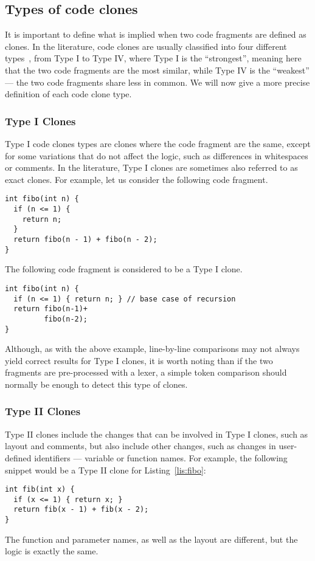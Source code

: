 \subsection{Types of code clones}
It is important to define what is implied when two code fragments are
defined as clones. In the literature, code clones are usually
classified into four different types~\cite{Roy07asurvey}, from Type I to Type IV,
where Type I is the ``strongest'', meaning here that the two code fragments are
the most similar, while Type IV is the ``weakest'' --- the two code fragments
share less in common. We will now give a more precise definition of each code
clone type.
\subsubsection{Type I Clones}
Type I code clones types are clones where the code fragment are the same,
except for some variations that do not affect the logic, such as differences
in whitespaces or comments. In the literature, Type I clones are sometimes also
referred to as exact clones.
For example, let us consider the following code fragment.
\begin{lstlisting}[caption=Fibonacci function,label=lis:fibo]
int fibo(int n) {
  if (n <= 1) {
    return n;
  }
  return fibo(n - 1) + fibo(n - 2);
}
\end{lstlisting}

The following code fragment is considered to be a Type I clone.
\begin{lstlisting}
int fibo(int n) {
  if (n <= 1) { return n; } // base case of recursion
  return fibo(n-1)+
         fibo(n-2);
}
\end{lstlisting}

Although, as with the above example, line-by-line comparisons may not always
yield correct results for Type I clones, it is worth noting than if the two
fragments are pre-processed with a lexer, a simple token comparison should
normally be enough to detect this type of clones.
\subsubsection{Type II Clones}
Type II clones include the changes that can be involved in Type I clones, such
as layout and comments, but also include other changes, such as changes in
user-defined identifiers --- variable or function names. For example, the
following snippet would be a Type II clone for Listing~\ref{lis:fibo}:
\begin{lstlisting}
int fib(int x) {
  if (x <= 1) { return x; }
  return fib(x - 1) + fib(x - 2);
}
\end{lstlisting}
The function and parameter names, as well as the layout are different, but the
logic is exactly the same.

